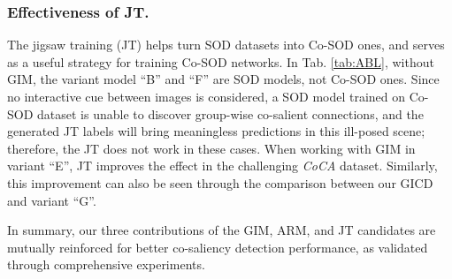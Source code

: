 \documentclass[runningheads,orivec]{llncs}
\newcommand{\tabref}[1]{Tab. \ref{#1}}
\begin{document}
\subsubsection{Effectiveness of JT.}
The jigsaw training (JT) helps turn SOD datasets into Co-SOD ones, and serves as a useful strategy for training Co-SOD networks.
In \tabref{tab:ABL}, without GIM, the variant model ``B'' and ``F'' are SOD models, not Co-SOD ones.
Since no interactive cue between images is considered,
a SOD model trained on Co-SOD dataset is unable to discover group-wise co-salient connections, and the generated JT labels will bring meaningless predictions in this ill-posed scene;
therefore, the JT does not work in these cases.
When working with GIM in variant ``E'',  JT improves the effect in the challenging \textit{CoCA} dataset.
Similarly, this improvement can also be seen through the comparison between our GICD and variant ``G''.

In summary, our three contributions of the GIM, ARM, and JT candidates are mutually reinforced for better co-saliency detection performance, as validated through comprehensive experiments.
\end{document}
